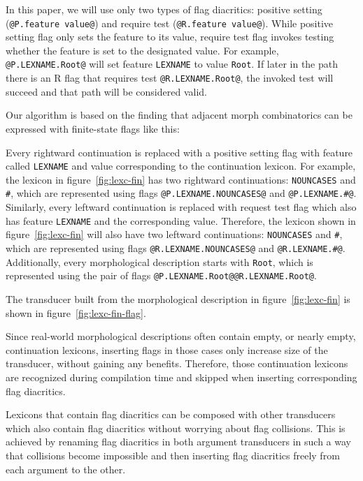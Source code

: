 \documentclass[11pt]{article}
\begin{document}
In this paper, we will use only two types of flag diacritics: positive
setting (\verb+@P.feature value@+) and require test
(\verb+@R.feature value@+). While positive setting flag only sets the
feature to its value, require test flag invokes testing whether the
feature is set to the designated value.  For example,
\verb+@P.LEXNAME.Root@+ will set feature \texttt{LEXNAME} to value
\texttt{Root}. If later in the path there is an R flag that requires test
\verb+@R.LEXNAME.Root@+, the invoked test will succeed and that path
will be considered valid.

Our algorithm is based on the finding that adjacent morph combinatorics can be expressed with finite-state flags like this:

Every rightward continuation is replaced with a positive setting flag
with feature called \texttt{LEXNAME} and value corresponding to the
continuation lexicon. For example, the lexicon in
figure~\ref{fig:lexc-fin} has two rightward continuations:
\texttt{NOUNCASES} and \texttt{\#}, which are represented using flags
\verb+@P.LEXNAME.NOUNCASES@+ and \verb+@P.LEXNAME.#@+.  Similarly,
every leftward continuation is replaced with request test flag which
also has feature \texttt{LEXNAME} and the corresponding
value. Therefore, the lexicon shown in figure~\ref{fig:lexc-fin} will
also have two leftward continuations: \texttt{NOUNCASES} and
\texttt{\#}, which are represented using flags
\verb+@R.LEXNAME.NOUNCASES@+ and \verb+@R.LEXNAME.#@+. Additionally,
every morphological description starts with \texttt{Root}, which is
represented using the pair of flags
\verb+@P.LEXNAME.Root@@R.LEXNAME.Root@+.

The transducer built from the morphological description in
figure~\ref{fig:lexc-fin} is shown in figure~\ref{fig:lexc-fin-flag}.

Since real-world morphological descriptions often contain empty, or nearly
empty, continuation lexicons, inserting flags in those cases only
increase size of the transducer, without gaining any
benefits. Therefore, those continuation lexicons are recognized
during compilation time and skipped when inserting corresponding flag
diacritics.



Lexicons that contain flag diacritics can be composed with other
transducers which also contain flag diacritics without worrying about
flag collisions. This is achieved by renaming flag diacritics in both
argument transducers in such a way that collisions become impossible
and then inserting flag diacritics freely from each argument to the
other.
\end{document}

